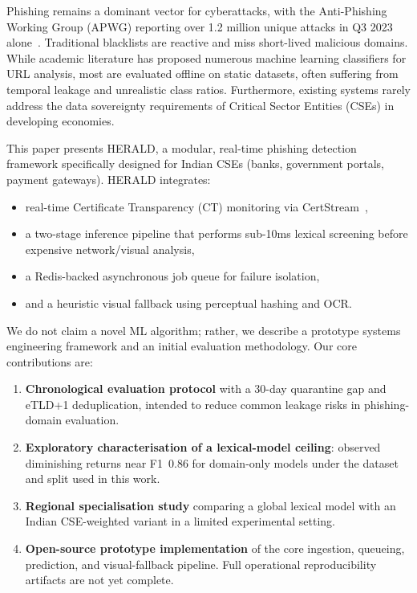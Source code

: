 \documentclass[conference]{IEEEtran}
\begin{document}
Phishing remains a dominant vector for cyberattacks, with the Anti-Phishing Working Group (APWG) reporting over 1.2 million unique attacks in Q3 2023 alone~\cite{apwg_report}. Traditional blacklists are reactive and miss short-lived malicious domains. While academic literature has proposed numerous machine learning classifiers for URL analysis, most are evaluated offline on static datasets, often suffering from temporal leakage and unrealistic class ratios. Furthermore, existing systems rarely address the data sovereignty requirements of Critical Sector Entities (CSEs) in developing economies.

This paper presents HERALD, a modular, real-time phishing detection framework specifically designed for Indian CSEs (banks, government portals, payment gateways). HERALD integrates:

\begin{itemize}
    \item real-time Certificate Transparency (CT) monitoring via CertStream~\cite{certstream},
    \item a two-stage inference pipeline that performs sub-10ms lexical screening before expensive network/visual analysis,
    \item a Redis-backed asynchronous job queue for failure isolation,
    \item and a heuristic visual fallback using perceptual hashing and OCR.
\end{itemize}

We do not claim a novel ML algorithm; rather, we describe a prototype systems engineering framework and an initial evaluation methodology. Our core contributions are:

\begin{enumerate}
    \item \textbf{Chronological evaluation protocol} with a 30-day quarantine gap and eTLD+1 deduplication, intended to reduce common leakage risks in phishing-domain evaluation.
    \item \textbf{Exploratory characterisation of a lexical-model ceiling}: observed diminishing returns near F1~0.86 for domain-only models under the dataset and split used in this work.
    \item \textbf{Regional specialisation study} comparing a global lexical model with an Indian CSE-weighted variant in a limited experimental setting.
    \item \textbf{Open-source prototype implementation} of the core ingestion, queueing, prediction, and visual-fallback pipeline. Full operational reproducibility artifacts are not yet complete.
\end{enumerate}
\end{document}
